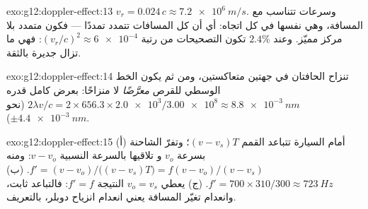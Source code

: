 \begin{solution}{exo:g12:doppler-effect:13}
$v_r = 0.024\,c \approx \qty{7.2e6}{m/s}$. وسرعات تتناسب مع المسافة، وهي نفسها في
كل اتجاه: أي أن كل المسافات تتمدد تمددًا  --- فكون متمدد بلا
مركز مميّز. وعند $2.4\%$ تكون التصحيحات من رتبة $(v_r/c)^2 \approx
\num{6e-4}$: فهي ما تزال جديرة بالثقة.
\end{solution}

\begin{solution}{exo:g12:doppler-effect:14}
تنزاح الحافتان في جهتين متعاكستين، ومن ثم يكون الخط الوسطي للقرص \emph{معرَّضًا} لا
منزاحًا: بعرض كامل قدره $2\lambda v/c = 2 \times 656.3 \times \num{2.0e3}/\num{3.00e8}
\approx \qty{8.8e-3}{nm}$ (نحو $\pm\qty{4.4e-3}{nm}$).
\end{solution}

\begin{solution}{exo:g12:doppler-effect:15}
(أ) أمام السيارة تتباعد القمم $(v - v_s)T$؛ وتفرّ الشاحنة بسرعة $v_o$ و
تلاقيها بالسرعة النسبية $v - v_o$: ومنه $f' = (v - v_o)/\bigl((v - v_s)T\bigr) =
f(v - v_o)/(v - v_s)$. (ب) $f' = 700 \times 310/300 \approx \qty{723}{Hz}$.
(ج) يعطي $v_o = v_s$ النتيجة $f' = f$: فالتباعد ثابت، وانعدام تغيّر المسافة
يعني انعدام انزياح دوبلر، بالتعريف.
\end{solution}

